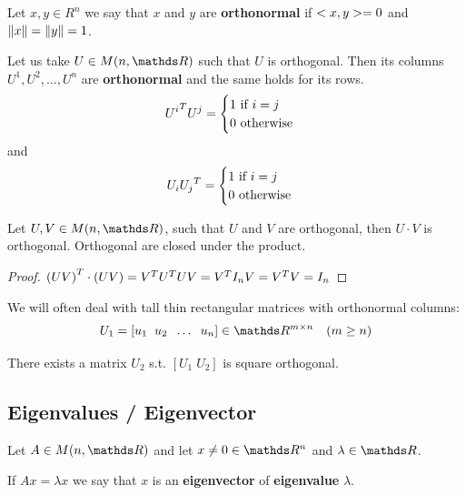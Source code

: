 \documentclass[computational_mathematics.tex]{subfiles}
\begin{document}
\begin{definition}[Orthonormality]
  Let $x, y \in R^n$ we say that $x$ and $y$ are \textbf{orthonormal} if $<x, y> = 0$ and $\left\lVert x\right\rVert = \left\lVert y\right\rVert = 1$.
\end{definition}

\begin{proposition}
  Let us take $U \in M(n, \R)$ such that $U$ is orthogonal. Then its columns $U^1, U^2, \ldots, U^n$ are \textbf{orthonormal} and the same holds for its rows.
  \[
  {U^i}^{T} U^j = \begin{cases}
    1 \text{ if } i=j\\
    0 \text{ otherwise}
  \end{cases}
  \]
  and
  \[
    U_i {U_j}^{T} = \begin{cases}
    1 \text{ if } i=j\\
    0 \text{ otherwise}
  \end{cases}
  \]
\end{proposition}

\begin{proposition}
  Let $U, V \in M(n, \R)$, such that $U$ and $V$ are orthogonal, then $U \cdot V$ is orthogonal. Orthogonal are closed under the product.
\end{proposition}
\begin{proof}
  ${(UV)}^{T} \cdot (UV) = {V}^{T} {U}^{T} U V = {V}^{T} I_n V = {V}^{T} V = I_n$
\end{proof}


\begin{proposition}
We will often deal with tall thin rectangular matrices with
orthonormal columns:
$$ U_1 = [u_1 \; \; u_2 \; \; \dots \; \; u_n] \in \R^{m \times n} \quad (m \geq n)$$

There exists a matrix $U_2$ s.t. $[U_1 \; U_2]$ is square orthogonal.

  
\end{proposition}

\subsection{Eigenvalues / Eigenvector}

\begin{definition}
  Let $A \in M(n, \R)$ and let $x \neq 0 \in \R^n$ and $\lambda \in \R$.

  If $Ax = \lambda x$ we say that $x$ is an \textbf{eigenvector} of \textbf{eigenvalue} $\lambda$.
\end{definition}
\end{document}
